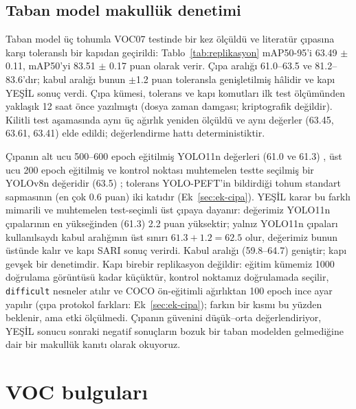 \documentclass[pdflatex,iicol,sn-mathphys-num]{sn-jnl}
\begin{document}
\subsection{Taban model makullük denetimi}\label{sec:replikasyon}



Taban model üç tohumla VOC07 testinde bir kez ölçüldü ve literatür çıpasına karşı toleranslı bir kapıdan geçirildi: Tablo~\ref{tab:replikasyon} mAP50-95'i 63.49 $\pm$ 0.11, mAP50'yi 83.51 $\pm$ 0.17 puan olarak verir. Çıpa aralığı 61.0--63.5 ve 81.2--83.6'dır; kabul aralığı bunun $\pm$1.2 puan toleransla genişletilmiş hâlidir ve kapı YEŞİL sonuç verdi. Çıpa kümesi, tolerans ve kapı komutları ilk test ölçümünden yaklaşık 12 saat önce yazılmıştı (dosya zaman damgası; kriptografik değildir). Kilitli test aşamasında aynı üç ağırlık yeniden ölçüldü ve aynı değerler (63.45, 63.61, 63.41) elde edildi; değerlendirme hattı deterministiktir.

Çıpanın alt ucu 500--600 epoch eğitilmiş YOLO11n değerleri (61.0 ve 61.3) \cite{zhang_2025_adlyolo,lin_2025_yolomaster}, üst ucu 200 epoch eğitilmiş ve kontrol noktası muhtemelen testte seçilmiş bir YOLOv8n değeridir (63.5) \cite{elhamdouni_2025_yolov8nvoc}; tolerans YOLO-PEFT'in bildirdiği tohum standart sapmasının (en çok 0.6 puan) iki katıdır \cite{lin_2026_yolopeft} (Ek~\ref{sec:ek-cipa}). YEŞİL karar bu farklı mimarili ve muhtemelen test-seçimli üst çıpaya dayanır: değerimiz YOLO11n çıpalarının en yükseğinden (61.3) 2.2 puan yüksektir; yalnız YOLO11n çıpaları kullanılsaydı kabul aralığının üst sınırı $61.3+1.2=62.5$ olur, değerimiz bunun üstünde kalır ve kapı SARI sonuç verirdi. Kabul aralığı (59.8--64.7) geniştir; kapı gevşek bir denetimdir. Kapı birebir replikasyon değildir: eğitim kümemiz 1000 doğrulama görüntüsü kadar küçüktür, kontrol noktamız doğrulamada seçilir, \texttt{difficult} nesneler atılır ve COCO ön-eğitimli ağırlıktan 100 epoch ince ayar yapılır (çıpa protokol farkları: Ek~\ref{sec:ek-cipa}); farkın bir kısmı bu yüzden beklenir, ama etki ölçülmedi. Çıpanın güvenini düşük--orta değerlendiriyor, YEŞİL sonucu sonraki negatif sonuçların bozuk bir taban modelden gelmediğine dair bir makullük kanıtı olarak okuyoruz.

\section{VOC bulguları}\label{sec:bulgular}


\end{document}
